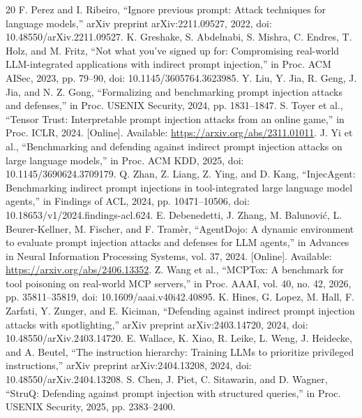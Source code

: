 \documentclass[conference]{IEEEtran}
\begin{document}
\begin{thebibliography}{20}
 F. Perez and I. Ribeiro, ``Ignore previous prompt: Attack techniques for language models,'' arXiv preprint arXiv:2211.09527, 2022, doi: 10.48550/arXiv.2211.09527.
 K. Greshake, S. Abdelnabi, S. Mishra, C. Endres, T. Holz, and M. Fritz, ``Not what you've signed up for: Compromising real-world LLM-integrated applications with indirect prompt injection,'' in Proc. ACM AISec, 2023, pp. 79--90, doi: 10.1145/3605764.3623985.
 Y. Liu, Y. Jia, R. Geng, J. Jia, and N. Z. Gong, ``Formalizing and benchmarking prompt injection attacks and defenses,'' in Proc. USENIX Security, 2024, pp. 1831--1847.
 S. Toyer et al., ``Tensor Trust: Interpretable prompt injection attacks from an online game,'' in Proc. ICLR, 2024. [Online]. Available: \url{https://arxiv.org/abs/2311.01011}.
 J. Yi et al., ``Benchmarking and defending against indirect prompt injection attacks on large language models,'' in Proc. ACM KDD, 2025, doi: 10.1145/3690624.3709179.
 Q. Zhan, Z. Liang, Z. Ying, and D. Kang, ``InjecAgent: Benchmarking indirect prompt injections in tool-integrated large language model agents,'' in Findings of ACL, 2024, pp. 10471--10506, doi: 10.18653/v1/2024.findings-acl.624.
 E. Debenedetti, J. Zhang, M. Balunović, L. Beurer-Kellner, M. Fischer, and F. Tramèr, ``AgentDojo: A dynamic environment to evaluate prompt injection attacks and defenses for LLM agents,'' in Advances in Neural Information Processing Systems, vol. 37, 2024. [Online]. Available: \url{https://arxiv.org/abs/2406.13352}.
 Z. Wang et al., ``MCPTox: A benchmark for tool poisoning on real-world MCP servers,'' in Proc. AAAI, vol. 40, no. 42, 2026, pp. 35811--35819, doi: 10.1609/aaai.v40i42.40895.
 K. Hines, G. Lopez, M. Hall, F. Zarfati, Y. Zunger, and E. Kiciman, ``Defending against indirect prompt injection attacks with spotlighting,'' arXiv preprint arXiv:2403.14720, 2024, doi: 10.48550/arXiv.2403.14720.
 E. Wallace, K. Xiao, R. Leike, L. Weng, J. Heidecke, and A. Beutel, ``The instruction hierarchy: Training LLMs to prioritize privileged instructions,'' arXiv preprint arXiv:2404.13208, 2024, doi: 10.48550/arXiv.2404.13208.
 S. Chen, J. Piet, C. Sitawarin, and D. Wagner, ``StruQ: Defending against prompt injection with structured queries,'' in Proc. USENIX Security, 2025, pp. 2383--2400.

\end{thebibliography}
\end{document}
